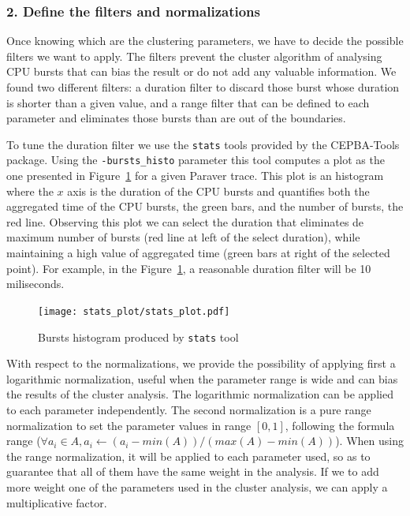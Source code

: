\documentclass[a4paper, 12pt]{article}
\begin{document}
\subsubsection*{2. Define the filters and normalizations}

Once knowing which are the clustering parameters, we have to decide the
possible filters we want to apply. The filters prevent the cluster algorithm
of analysing CPU bursts that can bias the result or do not add any valuable
information. We found two different filters: a duration filter to discard
those burst whose duration is shorter than a given value, and a range filter
that can be defined to each parameter and eliminates those bursts than are
out of the boundaries.

To tune the duration filter we use the \texttt{stats} tools provided by the
CEPBA-Tools package. Using the \texttt{-bursts\_histo} parameter this tool
computes a plot as the one presented in Figure~\ref{fig:stats_plot} for
a given Paraver trace. This plot is an histogram where the $x$ axis is the 
duration of the CPU bursts and quantifies both the aggregated time of the 
CPU bursts, the green bars, and the number of bursts, the red line. Observing
this plot we can select the duration that eliminates de maximum number of 
bursts (red line at left of the select duration), while maintaining a high 
value of aggregated time (green bars at right of the selected point).
For example, in the Figure~\ref{fig:stats_plot}, a reasonable duration filter 
will be 10 miliseconds.

\begin{figure}
  \texttt{[image: stats\_plot/stats\_plot.pdf]}
  \caption{Bursts histogram produced by \texttt{stats} tool}
  \label{fig:stats_plot}
\end{figure}

With respect to the normalizations, we provide the possibility of applying
first a logarithmic normalization, useful when the parameter range is wide
and can bias the results of the cluster analysis. The logarithmic 
normalization can be applied to each parameter independently. The second 
normalization is a pure range normalization to set the parameter values 
in range $[0,1]$, following the formula  range 
($\forall a_{i}\in A,a_{i}\leftarrow(a_{i}-min(A))/(max(A)-min(A))$).
When using the range normalization, it will be applied to each parameter used,
so as to guarantee that all of them have the same weight in the analysis. If
we to add more weight one of the parameters used in the cluster analysis, we
can apply a multiplicative factor.
\end{document}
